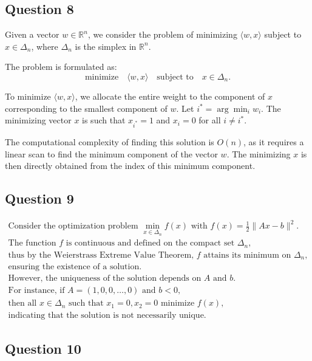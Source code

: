 \documentclass[12p]{article}
\begin{document}
\subsection*{Question 8} 


Given a vector \( w \in \mathbb{R}^n \), we consider the problem of minimizing \( \langle w, x \rangle \) subject to \( x \in \Delta_n \), where \( \Delta_n \) is the simplex in \( \mathbb{R}^n \).

The problem is formulated as:
\[ \text{minimize} \quad \langle w, x \rangle \quad \text{subject to} \quad x \in \Delta_n. \]

To minimize \( \langle w, x \rangle \), we allocate the entire weight to the component of \( x \) corresponding to the smallest component of \( w \). Let \( i^* = \arg \min_i w_i \). The minimizing vector \( x \) is such that \( x_{i^*} = 1 \) and \( x_i = 0 \) for all \( i \neq i^* \).


The computational complexity of finding this solution is \( O(n) \), as it requires a linear scan to find the minimum component of the vector \( w \). The minimizing \( x \) is then directly obtained from the index of this minimum component.


\subsection*{Question 9} 
\begin{align*}
\text{Consider the optimization problem } \min_{x \in \Delta_n} f(x) \text{ with } f(x) = \frac{1}{2} \|Ax - b\|^2. \\
\text{The function } f \text{ is continuous and defined on the compact set } \Delta_n, \\
\text{thus by the Weierstrass Extreme Value Theorem, } f \text{ attains its minimum on } \Delta_n, \\
\text{ensuring the existence of a solution.} \\
\text{However, the uniqueness of the solution depends on } A \text{ and } b. \\
\text{For instance, if } A = (1, 0, 0, \ldots, 0) \text{ and } b < 0, \\
\text{then all } x \in \Delta_n \text{ such that } x_1 = 0, x_2 = 0 \text{ minimize } f(x), \\
\text{indicating that the solution is not necessarily unique.}
\end{align*}

\subsection*{Question 10} 
\end{document}
